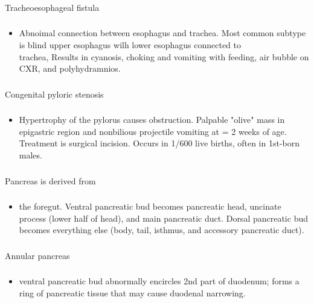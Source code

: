 \documentclass[11pt]{beamer}
\begin{document}
\begin{frame}
 \frametitle{}
Tracheoesophageal fistula
\end{frame}

\begin{frame}
 \frametitle{}
\begin{itemize}
\item{Abnoimal connection between esophagus and trachea. Most common subtype is blind upper esophagus wilh lower esophagus connected to \\ trachea, Results in cyanosis, choking and vomiting with feeding, air bubble on CXR, and polyhydramnios.}
\end{itemize}
\end{frame}

\begin{frame}
 \frametitle{}
Congenital pyloric stenosis
\end{frame}

\begin{frame}
 \frametitle{}
\begin{itemize}
\item{Hypertrophy of the pylorus causes obstruction. Palpable "olive" mass in epigastric region and nonbilious projectile vomiting at = 2 weeks of age. Treatment is surgical incision. Occurs in 1/600 live births, often in 1st-born males.}
\end{itemize}
\end{frame}

\begin{frame}
 \frametitle{}
Pancreas is derived from
\end{frame}

\begin{frame}
 \frametitle{}
\begin{itemize}
\item{the foregut. Ventral pancreatic bud becomes pancreatic head, uncinate process (lower half of head), and main pancreatic duct. Dorsal pancreatic bud becomes everything else (body, tail, isthmus, and accessory pancreatic duct).}
\end{itemize}
\end{frame}

\begin{frame}
 \frametitle{}
Annular pancreas
\end{frame}

\begin{frame}
 \frametitle{}
\begin{itemize}
\item{ventral pancreatic bud abnormally encircles 2nd part of duodenum; forms a ring of pancreatic tissue that may cause duodenal narrowing.}
\end{itemize}
\end{frame}
\end{document}
